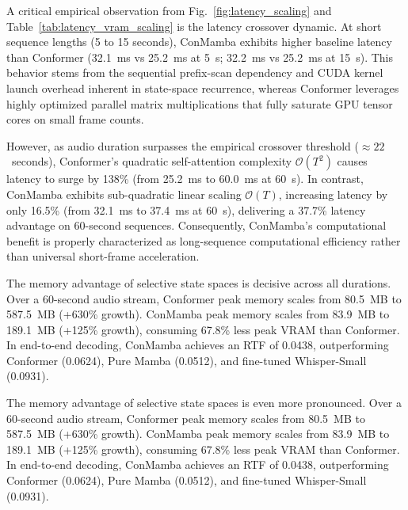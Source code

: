 \documentclass[journal]{IEEEtran}
\begin{document}
A critical empirical observation from Fig.~\ref{fig:latency_scaling} and Table~\ref{tab:latency_vram_scaling} is the latency crossover dynamic. At short sequence lengths (5 to 15 seconds), ConMamba exhibits higher baseline latency than Conformer (32.1~ms vs 25.2~ms at 5~s; 32.2~ms vs 25.2~ms at 15~s). This behavior stems from the sequential prefix-scan dependency and CUDA kernel launch overhead inherent in state-space recurrence, whereas Conformer leverages highly optimized parallel matrix multiplications that fully saturate GPU tensor cores on small frame counts.

However, as audio duration surpasses the empirical crossover threshold ($\approx 22$~seconds), Conformer's quadratic self-attention complexity $\mathcal{O}(T^2)$ causes latency to surge by 138\% (from 25.2~ms to 60.0~ms at 60~s). In contrast, ConMamba exhibits sub-quadratic linear scaling $\mathcal{O}(T)$, increasing latency by only 16.5\% (from 32.1~ms to 37.4~ms at 60~s), delivering a 37.7\% latency advantage on 60-second sequences. Consequently, ConMamba's computational benefit is properly characterized as long-sequence computational efficiency rather than universal short-frame acceleration.

The memory advantage of selective state spaces is decisive across all durations. Over a 60-second audio stream, Conformer peak memory scales from 80.5~MB to 587.5~MB (+630\% growth). ConMamba peak memory scales from 83.9~MB to 189.1~MB (+125\% growth), consuming 67.8\% less peak VRAM than Conformer. In end-to-end decoding, ConMamba achieves an RTF of 0.0438, outperforming Conformer (0.0624), Pure Mamba (0.0512), and fine-tuned Whisper-Small (0.0931).

The memory advantage of selective state spaces is even more pronounced. Over a 60-second audio stream, Conformer peak memory scales from 80.5~MB to 587.5~MB (+630\% growth). ConMamba peak memory scales from 83.9~MB to 189.1~MB (+125\% growth), consuming 67.8\% less peak VRAM than Conformer. In end-to-end decoding, ConMamba achieves an RTF of 0.0438, outperforming Conformer (0.0624), Pure Mamba (0.0512), and fine-tuned Whisper-Small (0.0931).
\end{document}
